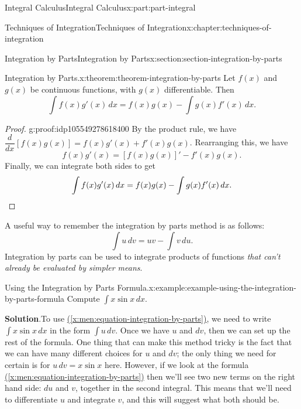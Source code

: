 \documentclass[twoside,10pt,]{book}
\newcommand{\blocktitlefont}{\relax}
\newcommand{\xreffont}{\relax}
\numberwithin{equation}{part}
\newcommand{\qedhere}{\relax}
\newcommand{\dv}[3][]{\dfrac{d^{#1} #2}{d #3^{#1}}}
\begin{document}
\begin{partptx}{Integral Calculus}{}{Integral Calculus}{}{}{x:part:part-integral}
\begin{chapterptx}{Techniques of Integration}{}{Techniques of Integration}{}{}{x:chapter:techniques-of-integration}
\begin{sectionptx}{Integration by Parts}{}{Integration by Parts}{}{}{x:section:section-integration-by-parts}
\begin{theorem}{Integration by Parts.}{}{x:theorem:theorem-integration-by-parts}%
%
Let \(f(x)\) and \(g(x)\) be continuous functions, with \(g(x)\) differentiable. Then%
%
\begin{equation*}
\int f(x)g'(x)\,dx = f(x)g(x) - \int g(x)f'(x)\,dx.
\end{equation*}
\end{theorem}
\begin{proof}{}{g:proof:idp105549278618400}
By the product rule, we have \(\dv{}{x}[f(x)g(x)] = f(x)g'(x) + f'(x)g(x)\). Rearranging this, we have%
\begin{equation*}
f(x)g'(x) = [f(x)g(x)]' - f'(x)g(x).
\end{equation*}
Finally, we can integrate both sides to get%
\begin{equation*}
\int f(x)g'(x)\,dx = f(x)g(x) - \int g(x)f'(x)\,dx.\qedhere
\end{equation*}
%
\end{proof}
A useful way to remember the integration by parts method is as follows:%
\begin{equation}
\int u\,dv = uv - \int v\,du.\label{x:men:equation-integration-by-parts}
\end{equation}
Integration by parts can be used to integrate products of functions \emph{that can't already be evaluated by simpler means}.%
\begin{example}{Using the Integration by Parts Formula.}{x:example:example-using-the-integration-by-parts-formula}%
Compute \(\int x\sin x\,dx\).%
\par\smallskip%
\noindent\textbf{\blocktitlefont Solution}.\hypertarget{g:solution:idp105549278622368}{}\quad{}To use \hyperref[x:men:equation-integration-by-parts]{({\xreffont\ref{x:men:equation-integration-by-parts}})}, we need to write \(\int x\sin x\,dx\) in the form \(\int u\,dv\). Once we have \(u\) and \(dv\), then we can set up the rest of the formula. One thing that can make this method tricky is the fact that we can have many different choices for \(u\) and \(dv\); the only thing we need for certain is for \(u\,dv = x\sin x\) here. However, if we look at the formula \hyperref[x:men:equation-integration-by-parts]{({\xreffont\ref{x:men:equation-integration-by-parts}})} then we'll see two new terms on the right hand side: \(du\) and \(v\), together in the second integral. This means that we'll need to differentiate \(u\) and integrate \(v\), and this will suggest what both should be.%

\end{example}
\end{sectionptx}
\end{chapterptx}
\end{partptx}
\end{document}
